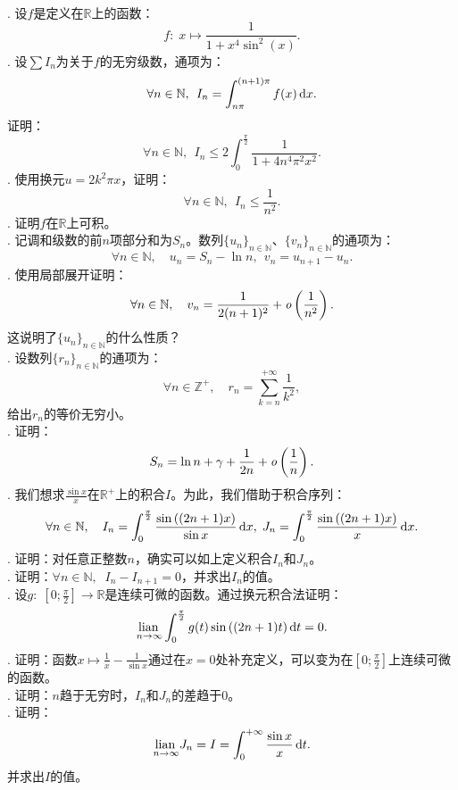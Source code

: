 \documentclass[12pt,UTF8,fontset=none]{ctexbook}
\begin{document}
\begin{xt}
    \mbox{} \\
    . 设$f$是定义在$\mathbb{R}$上的函数：
    $$ f: \; x\mapsto \frac{1}{1 + x^4 \sin^2{(x)}}. $$
    . 设$\sum I_n$为关于$f$的无穷级数，通项为：
    $$ \forall n\in \mathbb{N}, \; \, I_n = \int_{n\pi}^{(n+1)\pi} f(x) \,\mathrm{d}x. $$
    证明：
    $$ \forall n\in \mathbb{N}, \; \,I_n \leqslant 2 \int_{0}^{\frac{\pi}{2}} \frac{1}{1 + 4n^4\pi^2 x^2 }.  $$
    . 使用换元$u = 2k^2\pi x$，证明：
    $$ \forall n\in \mathbb{N}, \; \,I_n \leqslant \frac{1}{n^2}.  $$
    . 证明$f$在$\mathbb{R}$上可积。\\
    . 记调和级数的前$n$项部分和为$S_n$。数列$\{u_n\}_{n\in\mathbb{N}}$、$\{v_n\}_{n\in\mathbb{N}}$的通项为：
    $$ \forall n\in\mathbb{N},\quad u_n = S_n - \ln{n} ,\;\, v_n = u_{n+1} - u_n. $$
    . 使用局部展开证明：
    $$ \forall n\in\mathbb{N},\quad v_n = \frac{1}{2(n + 1)^2} + \mathit{o}\left(\frac{1}{n^2}\right). $$
    这说明了$\{u_n\}_{n\in\mathbb{N}}$的什么性质？\\
    . 设数列$\{ r_n \}_{n\in\mathbb{N}}$的通项为：
    $$ \forall n\in\mathbb{Z}^+,\quad  r_n = \sum_{k=n}^{+\infty} \frac{1}{k^2}, $$
    给出$r_n$的等价无穷小。\\
    . 证明：
    $$ S_n = \ln{n} + \gamma + \frac{1}{2n} + \mathit{o}\left(\frac{1}{n}\right). $$
    . 我们想求$\displaystyle \frac{\sin{x}}{x}$在$\mathbb{R}^+$上的积合$I$。为此，我们借助于积合序列：
    $$ \forall n\in\mathbb{N},\quad  I_n = \int_0^{\frac{\pi}{2}} \frac{\sin{((2n+1)x)}}{\sin{x}} \,\mathrm{d}x, \; J_n = \int_0^{\frac{\pi}{2}} \frac{\sin{((2n+1)x)}}{x} \,\mathrm{d}x .$$
    . 证明：对任意正整数$n$，确实可以如上定义积合$I_n$和$J_n$。\\
    . 证明：$\forall n \in\mathbb{N},\;\; I_n - I_{n+1} = 0$，并求出$I_n$的值。 \\
    . 设$g: \;\left[0;\frac{\pi}{2}\right] \rightarrow \mathbb{R}$是连续可微的函数。通过换元积合法证明：
    $$ \underset{n\to\infty}{\operatorname{lian}\,} \int_0^{\frac{\pi}{2}} g(t)\sin{((2n+1)t)} \,\mathrm{d}t = 0. $$
    . 证明：函数$\displaystyle x\mapsto \frac{1}{x} - \frac{1}{\sin{x}}$通过在$x=0$处补充定义，可以变为在$\left[0;\frac{\pi}{2}\right]$上连续可微的函数。\\
    . 证明：$n$趋于无穷时，$I_n$和$J_n$的差趋于$0$。\\
    . 证明：
    $$ \underset{n\to\infty}{\operatorname{lian}\,} J_n = I = \int_0^{+\infty} \frac{\sin{x}}{x} \,\mathrm{d}t. $$
    并求出$I$的值。
\end{xt}
\end{document}

